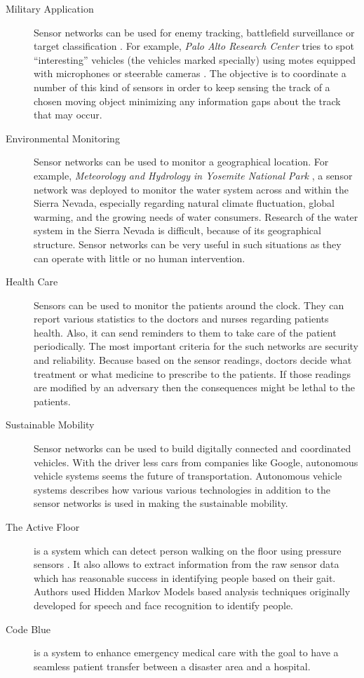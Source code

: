 	\begin{description}
		\item[Military Application]
			Sensor networks can be used for enemy tracking, battlefield surveillance or target classification \cite{li2002detection}.
			For example, \textit{Palo Alto Research Center} tries to spot ``interesting'' vehicles (the vehicles marked specially) using motes equipped with microphones or steerable cameras \cite{chu2004distributed}.
			The objective is to coordinate a number of this kind of sensors in order to keep sensing the track of a chosen moving object minimizing any information gaps about the track that may occur.

		\item[Environmental Monitoring] 
			Sensor networks can be used to monitor a geographical location. 
			For example, \textit{Meteorology and Hydrology in Yosemite National Park} \cite{lundquist2003meteorology}, a sensor network was deployed to monitor the water system across and within the Sierra Nevada, especially regarding natural climate fluctuation, global warming, and the growing needs of water consumers.
			Research of the water system in the Sierra Nevada is difficult, because of its geographical structure.
			Sensor networks can be very useful in such situations as they can operate with little or no human intervention.
		
		\item[Health Care]
			Sensors can be used to monitor the patients around the clock. 
			They can report various statistics to the doctors and nurses regarding patients health.
			Also, it can send reminders to them to take care of the patient periodically. 	
			The most important criteria for the such networks are security and reliability.
			Because based on the sensor readings, doctors decide what treatment or what medicine to prescribe to the patients.
			If those readings are modified by an adversary then the consequences might be lethal to the patients.

		\item[Sustainable Mobility]
			Sensor networks can be used to build digitally connected and coordinated vehicles.
			With the driver less cars from companies like Google, autonomous vehicle systems seems the future of transportation.
			Autonomous vehicle systems \cite{benenson2008towards} describes how various various technologies in addition to the sensor networks is used in making the sustainable mobility.
		
		\item[The Active Floor]
			is a system which can detect person walking on the floor using pressure sensors \cite{addlesee1997orl}.
			It also allows to extract information from the raw sensor data which has reasonable success in identifying people based on their gait.
			Authors used Hidden Markov Models based analysis techniques originally developed for speech and face recognition to identify people.
		
		\item[Code Blue]
			is a system to enhance emergency medical care with the goal to have a seamless patient transfer between a disaster area and a hospital\cite{lorincz2004sensor}.
	\end{description}
	
